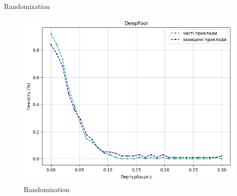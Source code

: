 \documentclass[aspectratio=169]{beamer}
\begin{document}
\begin{frame}{Randomization}
\begin{figure}[!htb]
			\endminipage
			\includegraphics[width=1\textwidth]{../CourseWorkLatex/resources/deepfool_rand_defence.png}
			\endminipage\hfill
			\caption{Randomization}
			\label{fig:randomization}
		\end{figure}
	\end{frame}

\end{document}
